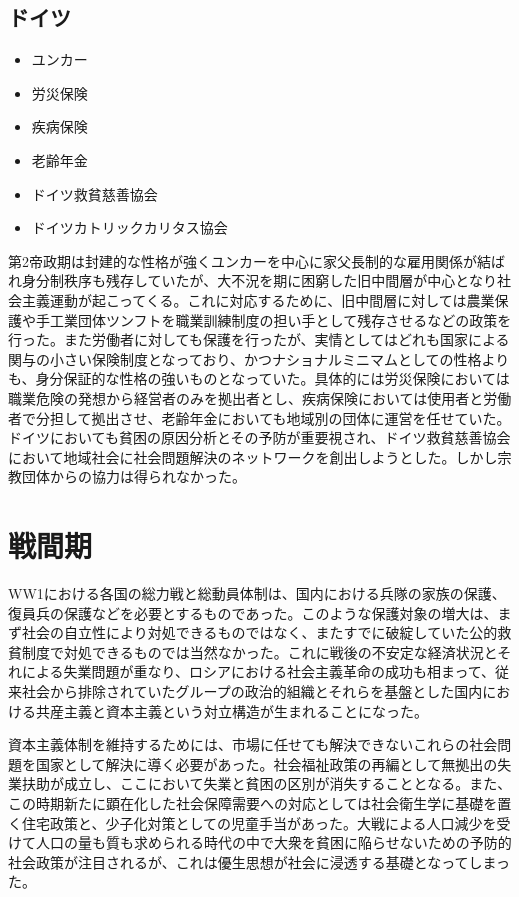 \documentclass{jsarticle}
\begin{document}
\subsection{ドイツ}
\begin{itemize}
	\item ユンカー
	\item 労災保険
	\item 疾病保険
	\item 老齢年金
	\item ドイツ救貧慈善協会
	\item ドイツカトリックカリタス協会
\end{itemize}

第2帝政期は封建的な性格が強くユンカーを中心に家父長制的な雇用関係が結ばれ身分制秩序も残存していたが、大不況を期に困窮した旧中間層が中心となり社会主義運動が起こってくる。これに対応するために、旧中間層に対しては農業保護や手工業団体ツンフトを職業訓練制度の担い手として残存させるなどの政策を行った。また労働者に対しても保護を行ったが、実情としてはどれも国家による関与の小さい保険制度となっており、かつナショナルミニマムとしての性格よりも、身分保証的な性格の強いものとなっていた。具体的には労災保険においては職業危険の発想から経営者のみを拠出者とし、疾病保険においては使用者と労働者で分担して拠出させ、老齢年金においても地域別の団体に運営を任せていた。ドイツにおいても貧困の原因分析とその予防が重要視され、ドイツ救貧慈善協会において地域社会に社会問題解決のネットワークを創出しようとした。しかし宗教団体からの協力は得られなかった。


\section{戦間期}
WW1における各国の総力戦と総動員体制は、国内における兵隊の家族の保護、復員兵の保護などを必要とするものであった。このような保護対象の増大は、まず社会の自立性により対処できるものではなく、またすでに破綻していた公的救貧制度で対処できるものでは当然なかった。これに戦後の不安定な経済状況とそれによる失業問題が重なり、ロシアにおける社会主義革命の成功も相まって、従来社会から排除されていたグループの政治的組織とそれらを基盤とした国内における共産主義と資本主義という対立構造が生まれることになった。

資本主義体制を維持するためには、市場に任せても解決できないこれらの社会問題を国家として解決に導く必要があった。社会福祉政策の再編として無拠出の失業扶助が成立し、ここにおいて失業と貧困の区別が消失することとなる。また、この時期新たに顕在化した社会保障需要への対応としては社会衛生学に基礎を置く住宅政策と、少子化対策としての児童手当があった。大戦による人口減少を受けて人口の量も質も求められる時代の中で大衆を貧困に陥らせないための予防的社会政策が注目されるが、これは優生思想が社会に浸透する基礎となってしまった。
\end{document}

